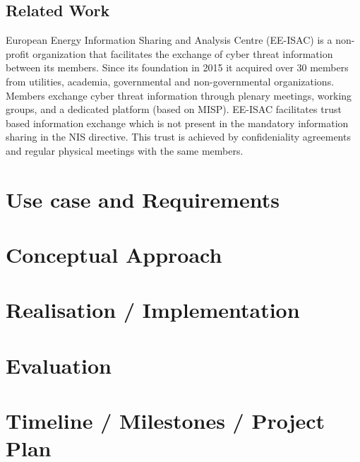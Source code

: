 \documentclass{article}
\begin{document}
\subsection*{Related Work}
European Energy Information Sharing and Analysis Centre (EE-ISAC) is a non-profit organization that facilitates the exchange of cyber threat information between its members. Since its foundation in 2015 it acquired over 30 members from utilities, academia, governmental and non-governmental organizations. Members exchange cyber threat information through plenary meetings, working groups, and a dedicated platform (based on MISP). EE-ISAC facilitates trust based information exchange which is not present in the mandatory information sharing in the NIS directive. This trust is achieved by confideniality agreements and regular physical meetings with the same members. \cite{isacpractical_2022}



\section{Use case and Requirements} %

\section{Conceptual Approach} %

\section{Realisation / Implementation} %


\section{Evaluation} %

\section{Timeline / Milestones / Project Plan} %

 

\end{document}
